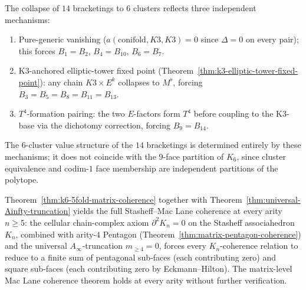 \begin{remark}
\label{rem:k6-cluster-structure}
The collapse of $14$ bracketings to $6$ clusters reflects three independent
mechanisms:
\begin{enumerate}
\item Pure-generic vanishing
 \textup{(}$a(\mathrm{conifold}, K3, K3) = 0$ since $\Delta = 0$ on
 every pair\textup{);} this forces $B_1 = B_2$,
 $B_4 = B_{10}$, $B_6 = B_7$.
\item K$3$-anchored elliptic-tower fixed point
 \textup{(}Theorem~\ref{thm:k3-elliptic-tower-fixed-point}\textup{):}
 any chain $K3 \times E^k$ collapses to $M^\flat$, forcing
 $B_3 = B_5 = B_8 = B_{11} = B_{13}$.
\item $T^4$-formation pairing: the two $E$-factors form $T^4$ before
 coupling to the K$3$-base via the dichotomy correction, forcing
 $B_9 = B_{14}$.
\end{enumerate}
The $6$-cluster value structure of the $14$ bracketings is determined
entirely by these mechanisms; it does not coincide with the $9$-face
partition of $K_6$, since cluster equivalence and codim-$1$ face
membership are independent partitions of the polytope.
\end{remark}

\begin{remark}
\label{rem:k6-coherence-implies-higher}
Theorem~\ref{thm:k6-5fold-matrix-coherence} together with
Theorem~\ref{thm:universal-Ainfty-truncation} yields the full
Stasheff--Mac Lane coherence at every arity $n \geq 5$: the cellular
chain-complex axiom $\partial^2 K_n = 0$ on the Stasheff associahedron
$K_n$, combined with arity-$4$ Pentagon
\textup{(}Theorem~\ref{thm:matrix-pentagon-coherence}\textup{)} and the
universal $A_\infty$-truncation $m_{\geq 4} = 0$, forces every
$K_n$-coherence relation to reduce to a finite sum of pentagonal
sub-faces \textup{(}each contributing zero\textup{)} and square
sub-faces \textup{(}each contributing zero by Eckmann--Hilton\textup{).}
The matrix-level Mac Lane coherence theorem holds at every arity
without further verification.
\end{remark}

